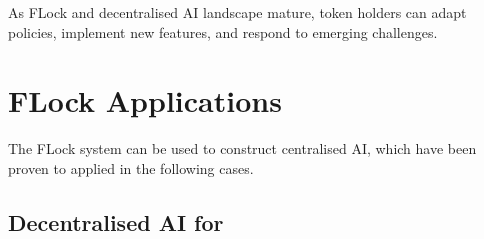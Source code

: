 \documentclass[conference]{IEEEtran}
\begin{document}
As FLock and decentralised AI landscape mature, token holders can adapt policies, implement new features, and respond to emerging challenges.





\section{FLock Applications}

The FLock system can be used to construct centralised AI, which have been proven to applied in the following cases.

\subsection{Decentralised AI for \LLMs}
\end{document}
